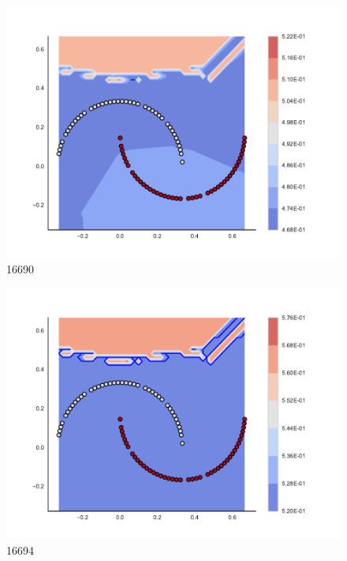 \begin{subfigure}[b]{0.09\textwidth}
    \includegraphics[clip, trim=2.35cm 1.75cm 4.5cm 0cm,width=\textwidth]{img/convergence/16690.pdf}
    \caption{16690}
    \label{fig:convergence_16690}
\end{subfigure}
%
\begin{subfigure}[b]{0.09\textwidth}
    \includegraphics[clip, trim=2.35cm 1.75cm 4.5cm 0cm,width=\textwidth]{img/convergence/16694.pdf}
    \caption{16694}
    \label{fig:convergence_16694}
\end{subfigure}
%
